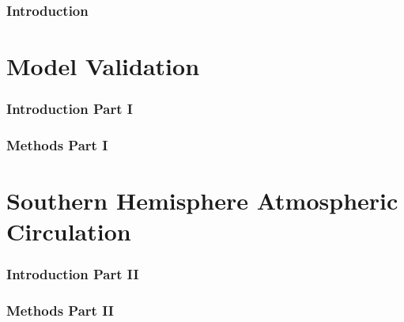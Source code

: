 \documentclass[12pt]{article}
\begin{document}


\section{Introduction}

\newpage

\part{Model Validation}
\section{Introduction Part I}

\newpage

\section{Methods Part I}

\newpage

\part{Southern Hemisphere Atmospheric Circulation}
\section{Introduction Part II}

\newpage

\section{Methods Part II}


% 
% 
% 

% 

% 

\newpage
\printbibliography
\end{document}
